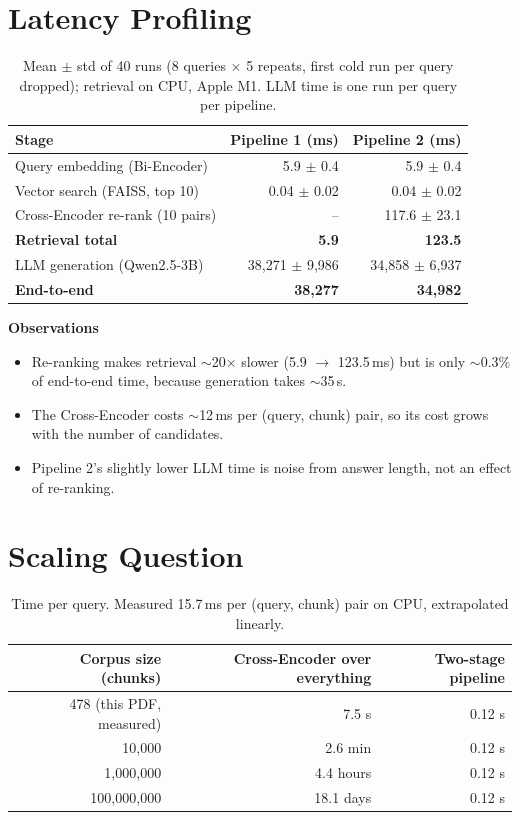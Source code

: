 \documentclass[11pt,a4paper]{article}
\newenvironment{observations}
  {\par\smallskip\noindent\textbf{Observations}\begin{itemize}}
  {\end{itemize}\smallskip}
\begin{document}
\section{Latency Profiling}

\begin{table}[H]
\centering\small
\begin{tabular}{lrr}
\toprule
\textbf{Stage} & \textbf{Pipeline 1 (ms)} & \textbf{Pipeline 2 (ms)} \\
\midrule
Query embedding (Bi-Encoder) & 5.9 $\pm$ 0.4 & 5.9 $\pm$ 0.4 \\
Vector search (FAISS, top 10) & 0.04 $\pm$ 0.02 & 0.04 $\pm$ 0.02 \\
Cross-Encoder re-rank (10 pairs) & -- & 117.6 $\pm$ 23.1 \\
\textbf{Retrieval total} & \textbf{5.9} & \textbf{123.5} \\
\midrule
LLM generation (Qwen2.5-3B) & 38{,}271 $\pm$ 9{,}986 & 34{,}858 $\pm$ 6{,}937 \\
\textbf{End-to-end} & \textbf{38{,}277} & \textbf{34{,}982} \\
\bottomrule
\end{tabular}
\caption{Mean $\pm$ std of 40 runs (8 queries $\times$ 5 repeats, first cold run per query dropped);
retrieval on CPU, Apple M1. LLM time is one run per query per pipeline.}
\end{table}

\begin{observations}
  \item Re-ranking makes retrieval $\sim$20$\times$ slower (5.9 $\rightarrow$ 123.5\,ms) but is only
        $\sim$0.3\% of end-to-end time, because generation takes $\sim$35\,s.
  \item The Cross-Encoder costs $\sim$12\,ms per (query, chunk) pair, so its cost grows with the number of candidates.
  \item Pipeline 2's slightly lower LLM time is noise from answer length, not an effect of re-ranking.
\end{observations}

\section{Scaling Question}

\begin{table}[H]
\centering\small
\begin{tabular}{rrr}
\toprule
\textbf{Corpus size (chunks)} & \textbf{Cross-Encoder over everything} & \textbf{Two-stage pipeline} \\
\midrule
478 (this PDF, measured) & 7.5 s & 0.12 s \\
10{,}000 & 2.6 min & 0.12 s \\
1{,}000{,}000 & 4.4 hours & 0.12 s \\
100{,}000{,}000 & 18.1 days & 0.12 s \\
\bottomrule
\end{tabular}
\caption{Time per query. Measured 15.7\,ms per (query, chunk) pair on CPU, extrapolated linearly.}
\end{table}
\end{document}
